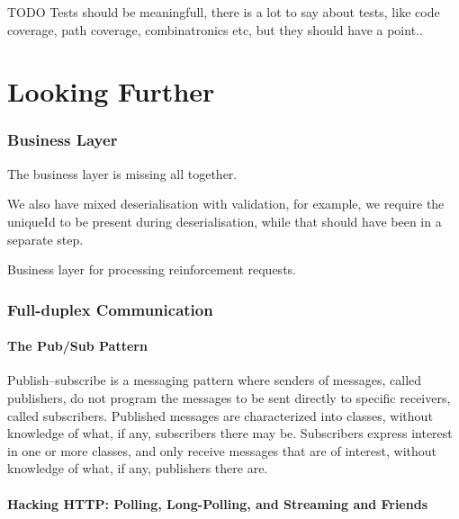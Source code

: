 \documentclass[12pt]{scrartcl}
\begin{document}
TODO Tests should be meaningfull, there is a lot to say about tests, like code coverage, path coverage, combinatronics etc, but they should have a point..

\part{Looking Further}

\section{Business Layer}

The business layer is missing all together.

We also have mixed deserialisation with validation, for example, we require the uniqueId to be present during deserialisation, while that should have been in a separate step.

Business layer for processing reinforcement requests.

\section{Full-duplex Communication}

\subsection{The Pub/Sub Pattern}

Publish–subscribe is a messaging pattern where senders of messages, called publishers, do not program the messages to be sent directly to specific receivers, called subscribers. Published messages are characterized into classes, without knowledge of what, if any, subscribers there may be. Subscribers express interest in one or more classes, and only receive messages that are of interest, without knowledge of what, if any, publishers there are.

\subsection{Hacking HTTP: Polling, Long-Polling, and Streaming and Friends}

\end{document}
